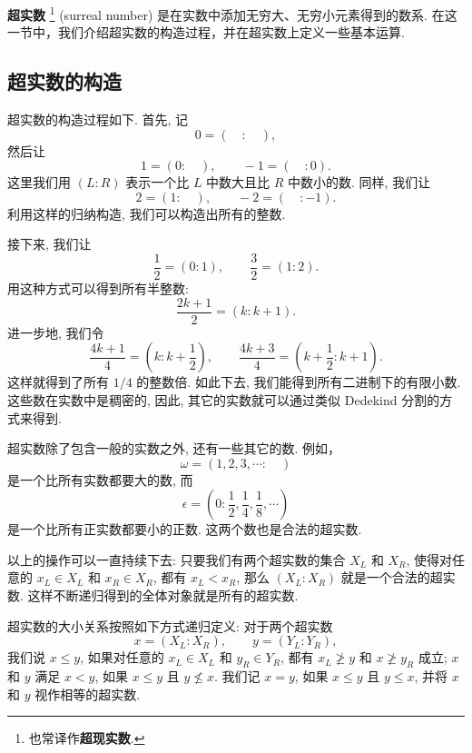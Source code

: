
\textbf{超实数}%
\footnote{也常译作\textbf{超现实数}.}
(surreal number)
是在实数中添加无穷大、无穷小元素得到的数系.
在这一节中，我们介绍超实数的构造过程，并在超实数上定义一些基本运算. 


\subsection{超实数的构造}

超实数的构造过程如下. 首先, 记 
\[0=(\quad:\quad),\] 
然后让 
\[1=(0:\quad), \hspace{2em} -1=(\quad:0).\] 
这里我们用 $(L:R)$ 表示一个比 $L$ 中数大且比 $R$ 中数小的数.
同样, 我们让 
\[2=(1:\quad), \hspace{2em} -2=(\quad:-1).\]
利用这样的归纳构造, 我们可以构造出所有的整数.  

接下来, 我们让 
\[\frac{1}{2}=(0:1), \hspace{2em} \frac{3}{2}=(1:2).\] 
用这种方式可以得到所有半整数: 
\[\frac{2k+1}{2}=(k:k+1).\]
进一步地, 我们令 
\[\frac{4k+1}{4}=\left(k:k+\frac{1}{2}\right), \hspace{2em} 
\frac{4k+3}{4}=\left(k+\frac{1}{2}:k+1\right). \]
这样就得到了所有 $1/4$ 的整数倍.
如此下去, 我们能得到所有二进制下的有限小数.
这些数在实数中是稠密的, 因此, 其它的实数就可以通过类似 Dedekind 分割的方式来得到.

超实数除了包含一般的实数之外, 还有一些其它的数.
例如，\[\omega = (1,2,3,\cdots:\quad)\] 是一个比所有实数都要大的数,
而 \[\epsilon = \left(0:\frac{1}{2},\frac{1}{4},\frac{1}{8},\cdots\right)\] 
是一个比所有正实数都要小的正数.  这两个数也是合法的超实数. 

以上的操作可以一直持续下去: 只要我们有两个超实数的集合 $X_L$ 和 $X_R$,
使得对任意的 $x_L\in X_L$ 和 $x_R\in X_R$, 都有 $x_L<x_R$, 
那么 $(X_L:X_R)$ 就是一个合法的超实数. 
这样不断递归得到的全体对象就是所有的超实数.

超实数的大小关系按照如下方式递归定义: 
对于两个超实数 \[x=(X_L:X_R), \hspace{2em} y=(Y_L:Y_R),\]
我们说 $x\le y$, 如果对任意的 $x_L\in X_L$ 和 $y_R\in Y_R$,
都有 $x_L\ngeq y$ 和 $x\ngeq y_R$ 成立; 
$x$ 和 $y$ 满足 $x<y$, 如果 $x\le y$ 且 $y\nleq x$.
我们记 $x=y$, 如果 $x\le y$ 且 $y\le x$, 
并将 $x$ 和 $y$ 视作相等的超实数. 

